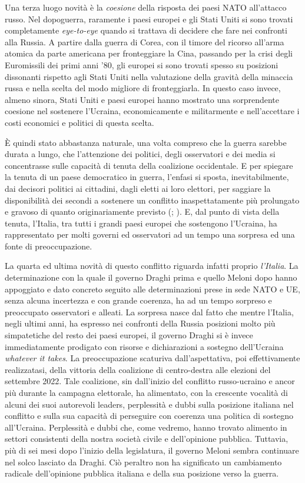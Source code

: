\documentclass[
]{book}
\begin{document}
Una terza luogo novità è la \emph{coesione} della risposta dei paesi NATO all'attacco russo. Nel dopoguerra, raramente i paesi europei e gli Stati Uniti si sono trovati completamente \emph{eye-to-eye} quando si trattava di decidere che fare nei confronti alla Russia. A partire dalla guerra di Corea, con il timore del ricorso all'arma atomica da parte americana per fronteggiare la Cina, passando per la crisi degli Euromissili dei primi anni '80, gli europei si sono trovati spesso su posizioni dissonanti rispetto agli Stati Uniti nella valutazione della gravità della minaccia russa e nella scelta del modo migliore di fronteggiarla. In questo caso invece, almeno sinora, Stati Uniti e paesi europei hanno mostrato una sorprendente coesione nel sostenere l'Ucraina, economicamente e militarmente e nell'accettare i costi economici e politici di questa scelta.

È quindi stato abbastanza naturale, una volta compreso che la guerra sarebbe durata a lungo, che l'attenzione dei politici, degli osservatori e dei media si concentrasse sulle capacità di tenuta della coalizione occidentale. E per spiegare la tenuta di un paese democratico in guerra, l'enfasi si sposta, inevitabilmente, dai decisori politici ai cittadini, dagli eletti ai loro elettori, per saggiare la disponibilità dei secondi a sostenere un conflitto inaspettatamente più prolungato e gravoso di quanto originariamente previsto (\citet{Mueller1971}; \citet{Aldrich-et-al2006}). E, dal punto di vista della tenuta, l'Italia, tra tutti i grandi paesi europei che sostengono l'Ucraina, ha rappresentato per molti governi ed osservatori ad un tempo una sorpresa ed una fonte di preoccupazione.

La quarta ed ultima novità di questo conflitto riguarda infatti proprio \emph{l'Italia}. La determinazione con la quale il governo Draghi prima e quello Meloni dopo hanno appoggiato e dato concreto seguito alle determinazioni prese in sede NATO e UE, senza alcuna incertezza e con grande coerenza, ha ad un tempo sorpreso e preoccupato osservatori e alleati. La sorpresa nasce dal fatto che mentre l'Italia, negli ultimi anni, ha espresso nei confronti della Russia posizioni molto più simpatetiche del resto dei paesi europei, il governo Draghi si è invece immediatamente prodigato con risorse e dichiarazioni a sostegno dell'Ucraina \emph{whatever it takes}. La preoccupazione scaturiva dall'aspettativa, poi effettivamente realizzatasi, della vittoria della coalizione di centro-destra alle elezioni del settembre 2022. Tale coalizione, sin dall'inizio del conflitto russo-ucraino e ancor più durante la campagna elettorale, ha alimentato, con la crescente vocalità di alcuni dei suoi autorevoli leaders, perplessità e dubbi sulla posizione italiana nel conflitto e sulla sua capacità di perseguire con coerenza una politica di sostegno all'Ucraina. Perplessità e dubbi che, come vedremo, hanno trovato alimento in settori consistenti della nostra società civile e dell'opinione pubblica. Tuttavia, più di sei mesi dopo l'inizio della legislatura, il governo Meloni sembra continuare nel solco lasciato da Draghi. Ciò peraltro non ha significato un cambiamento radicale dell'opinione pubblica italiana e della sua posizione verso la guerra.
\end{document}
